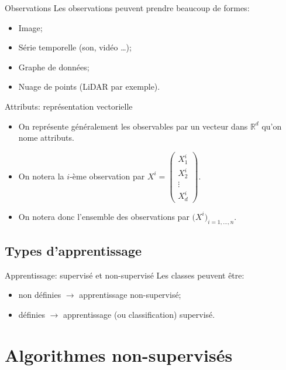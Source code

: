 \documentclass[8pt]{beamer}
\begin{document}
			\begin{frame}{Observations}
				Les observations peuvent prendre beaucoup de formes:
				\begin{itemize}
					\item<2-> Image;
					\item<3-> Série temporelle (son, vidéo \dots);
					\item<4-> Graphe de données;
					\item<5-> Nuage de points (LiDAR par exemple).
				\end{itemize}
			\end{frame}

			\begin{frame}{Attributs: représentation vectorielle}
				\begin{itemize}
					\item<1-> On représente généralement les observables par un vecteur dans \(\mathbb{R}^d\) qu'on nome attributs.
					\item<2-> On notera la \(i\)-ème observation par \(X^i = \begin{pmatrix}
						X^i_1\\
						X^i_2\\
						\vdots\\
						X^i_d
					\end{pmatrix}\).
					\item<3-> On notera donc l'ensemble des observations par \(\big( X^i \big)_{i=1,\dots, n}\).
				\end{itemize}
			\end{frame}

		\subsection{Types d'apprentissage}
			\begin{frame}{Apprentissage: supervisé et non-supervisé}
				Les classes peuvent être:
				\begin{itemize}
					\item<2-> non définies \(\longrightarrow\) apprentissage non-supervisé;
					\item<3-> définies \(\longrightarrow\) apprentissage (ou classification) supervisé.
				\end{itemize}
			\end{frame}

	\section{Algorithmes non-supervisés}
\end{document}
